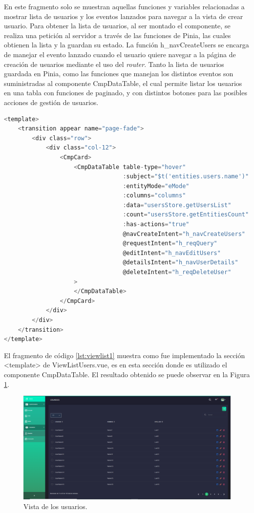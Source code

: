 En este fragmento solo se muestran aquellas funciones y variables relacionadas a mostrar lista de usuarios y los eventos lanzados para navegar a la vista de crear usuario. Para obtener la lista de usuarios, al ser montado el componente, se realiza una petición al servidor a través de las funciones de Pinia, las cuales obtienen la lista y la guardan su estado. La función h\_navCreateUsers se encarga de manejar el evento lanzado cuando el usuario quiere navegar a la página de creación de usuarios mediante el uso del \textit{router}. Tanto la lista de usuarios guardada en Pinia, como las funciones que manejan los distintos eventos son suministradas al componente CmpDataTable, el cual permite listar los usuarios en una tabla con funciones de paginado, y con distintos botones para las posibles acciones de gestión de usuarios.

\begin{lstlisting}[language=C,caption={Sección <template> de ViewListUsers.vue}, label={lst:viewlist1}]
<template>
    <transition appear name="page-fade">
        <div class="row">
            <div class="col-12">
                <CmpCard>
                    <CmpDataTable table-type="hover"
                                  :subject="$t('entities.users.name')"
                                  :entityMode="eMode"
                                  :columns="columns"
                                  :data="usersStore.getUsersList"
                                  :count="usersStore.getEntitiesCount"
                                  :has-actions="true"
                                  @navCreateIntent="h_navCreateUsers"
                                  @requestIntent="h_reqQuery"
                                  @editIntent="h_navEditUsers"
                                  @detailsIntent="h_navUserDetails"
                                  @deleteIntent="h_reqDeleteUser"
                    >
                    </CmpDataTable>
                </CmpCard>
            </div>
        </div>
    </transition>
</template>
\end{lstlisting}

El fragmento de código \ref{lst:viewlist1} muestra como fue implementado la sección <template> de ViewListUsers.vue, es en esta sección donde es utilizado el componente CmpDataTable. El resultado obtenido se puede observar en la Figura \ref{fig:usersList}.

\begin{figure}[htbp]
\centering
\includegraphics[width=\textwidth]{Graphics/usersList}
\caption{Vista de los usuarios.}
\label{fig:usersList}
\end{figure}

